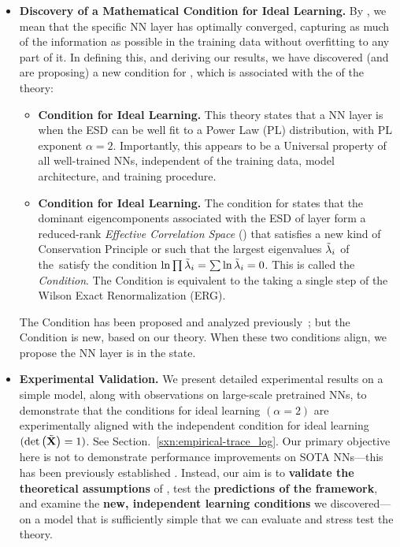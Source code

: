 \begin{itemize}
   \item 
     \textbf{Discovery of a Mathematical Condition for Ideal Learning.}
     By \IdealLearning, we mean that the specific NN layer has optimally converged, capturing as
     much of the information as possible in the training data without overfitting to any part of it.
     In defining this, and deriving our results, we have discovered (and are proposing) a new condition
     for \IdealLearning, which is associated with the \Universality of the \HTSR theory:
   \begin{itemize}
      \item 
        \textbf{\HTSR Condition for Ideal Learning.}
        This \HTSR theory states that a NN layer is \Ideal  when the ESD can be well fit to a
        Power Law (PL) distribution, with PL exponent $\alpha = 2$. Importantly, 
        this appears to be a Universal property of all well-trained NNs, independent of the training data,
        model architecture, and training procedure.
      \item 
        \textbf{\SETOL \TRACELOG Condition for Ideal Learning.}
        The \SETOL condition for \IdealLearning states that the 
        dominant eigencomponents associated with the ESD 
        of layer form a reduced-rank \emph{Effective Correlation Space} (\ECS) that satisfies
        a new kind of Conservation Principle
        or \emph{\VolumePreservingTransformation} such that the largest eigenvalues $\tilde{\lambda}_{i}$ of the~\ECS satisfy
        the condition  $\ln \prod \tilde{\lambda}_{i} = \sum \ln \tilde{\lambda}_{i} = 0$.  
        This is called the \emph{\TRACELOG Condition}.  The \TRACELOG Condition is equivalent to the taking a single step of the Wilson Exact Renormalization (ERG).
   \end{itemize}

   The \HTSR Condition has been proposed and analyzed previously~\cite{MM18_TR_JMLRversion,MM20a_trends_NatComm,YTHx23_KDD}; but
   the \TRACELOG Condition is new, based on our \SETOL theory.
   When these two conditions align, we propose the NN layer is in the \Ideal state.

   \item 
   \textbf{Experimental Validation.} 
   We present detailed experimental results on a simple model, along with observations on large-scale pretrained NNs, to demonstrate that the \HTSR conditions for ideal learning $(\alpha = 2)$ are experimentally aligned with the independent \SETOL condition for ideal learning
   $(\mbox{}{\text{det}}\left(\tilde{\mathbf{X}}\right)=1)$. 
   See Section.~\ref{sxn:empirical-trace_log}.
   Our primary objective here is not to demonstrate performance improvements on SOTA NNs---this has been previously established \cite{NEURIPS2023_CHM}. 
   Instead, our aim is to \textbf{validate the theoretical assumptions} of \SETOL, test the \textbf{predictions of the \SETOL framework}, and examine the \textbf{new, independent learning conditions} we discovered---on a model that is sufficiently simple that we can evaluate and stress test the theory.


\end{itemize}
